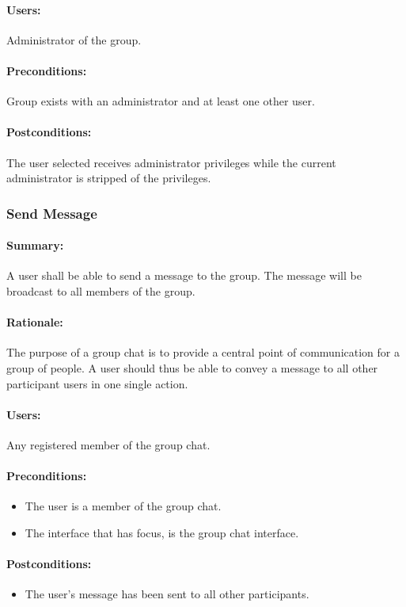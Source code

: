 \documentclass[11pt]{article}
\begin{document}
\paragraph{Users:}
Administrator of the group.
\paragraph{Preconditions:}
Group exists with an administrator and at least one other user.
\paragraph{{Postconditions:}}
The user selected receives administrator privileges while the current administrator is stripped of the privileges.

\subsubsection{Send Message} \label{UC-send-message}
\paragraph{Summary:} A user shall be able to send a message to the group. The message will be broadcast to all members of the group.
\paragraph{Rationale:} The purpose of a group chat is to provide a central point of communication for a group of people. A user should thus be able to convey a message to all other participant users in one single action.
\paragraph{Users:} Any registered member of the group chat.
\paragraph{Preconditions:} 
\begin{itemize}
\item The user is a member of the group chat.
\item The interface that has focus, is the group chat interface.
\end{itemize}
\paragraph{{Postconditions:}}
\begin{itemize}
\item The user's message has been sent to all other participants.
\end{itemize}
\end{document}
